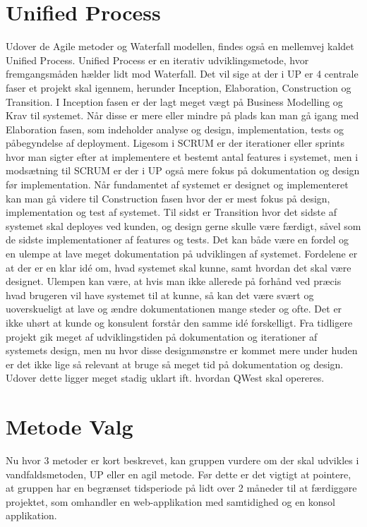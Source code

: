 \section{Unified Process}
Udover de Agile metoder og Waterfall modellen, findes også en mellemvej kaldet Unified Process\cite{UnifiedProcess}. Unified Process er en iterativ udviklingsmetode, hvor fremgangsmåden hælder lidt mod Waterfall. Det vil sige at der i UP er 4 centrale faser et projekt skal igennem, herunder Inception, Elaboration, Construction og Transition. I Inception fasen er der lagt meget vægt på Business Modelling og Krav til systemet. Når disse er mere eller mindre på plads kan man gå igang med Elaboration fasen, som indeholder analyse og design, implementation, tests og påbegyndelse af deployment. Ligesom i SCRUM er der iterationer eller sprints hvor man sigter efter at implementere et bestemt antal features i systemet, men i modsætning til SCRUM er der i UP også mere fokus på dokumentation og design før implementation. Når fundamentet af systemet er designet og implementeret kan man gå videre til Construction fasen hvor der er mest fokus på design, implementation og test af systemet. Til sidst er Transition hvor det sidste af systemet skal deployes ved kunden, og design gerne skulle være færdigt, såvel som de sidste implementationer af features og tests. 
Det kan både være en fordel og en ulempe at lave meget dokumentation på udviklingen af systemet. Fordelene er at der er en klar idé om, hvad systemet skal kunne, samt hvordan det skal være designet. Ulempen kan være, at hvis man ikke allerede på forhånd ved præcis hvad brugeren vil have systemet til at kunne, så kan det være svært og uoverskueligt at lave og ændre dokumentationen mange steder og ofte. Det er ikke uhørt at kunde og konsulent forstår den samme idé forskelligt. Fra tidligere projekt gik meget af udviklingstiden på dokumentation og iterationer af systemets design, men nu hvor disse designmønstre er kommet mere under huden er det ikke lige så relevant at bruge så meget tid på dokumentation og design. Udover dette ligger meget stadig uklart ift. hvordan QWest skal opereres.

\section{Metode Valg}
Nu hvor 3 metoder er kort beskrevet, kan gruppen vurdere om der skal udvikles i vandfaldsmetoden, UP eller en agil metode. Før dette er det vigtigt at pointere, at gruppen har en begrænset tidsperiode på lidt over 2 måneder til at færdiggøre projektet, som omhandler en web-applikation med samtidighed og en konsol applikation.

